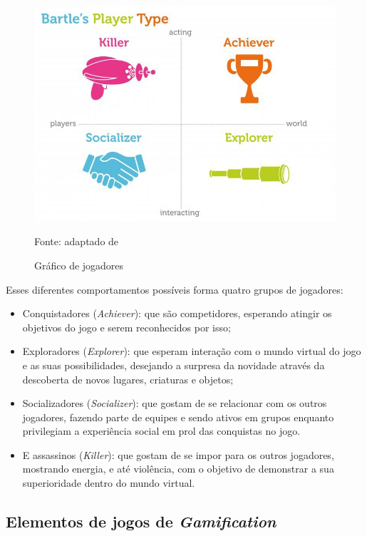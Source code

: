 \documentclass[
	12pt,				%
	openany,			%
	oneside,			%
	a4paper,			%
	english,			%
	french,				%
	spanish,			%
	brazil				%
	]{abntex2}
\begin{document}
\begin{figure}[!htb]
    \centering
\caption{Gráfico de jogadores}
\includegraphics[width=13cm]{figuras/bartle.png}
\par
 Fonte: adaptado de 
\end{figure}

Esses diferentes comportamentos possíveis forma quatro grupos de jogadores:

\begin{itemize}
\item Conquistadores (\textit{Achiever}): que são competidores, esperando atingir os objetivos do jogo e serem reconhecidos por isso;
\item Exploradores (\textit{Explorer}): que esperam interação com o mundo virtual do jogo e as suas possibilidades, desejando a surpresa da novidade através da descoberta de novos lugares, criaturas e objetos;
\item Socializadores (\textit{Socializer}): que gostam de se relacionar com os outros jogadores, fazendo parte de equipes e sendo ativos em grupos enquanto privilegiam a experiência social em prol das conquistas no jogo.
\item E assassinos (\textit{Killer}): que gostam de se impor para os outros jogadores, mostrando energia, e até violência, com o objetivo de demonstrar a sua superioridade dentro do mundo virtual.
\end{itemize}

\subsection  {Elementos de jogos de \itshape Gamification}
\end{document}

